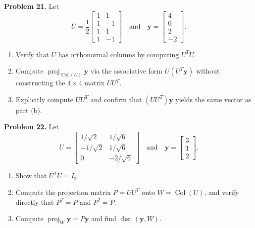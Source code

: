 \documentclass[11pt, letterpaper]{article}
\theoremstyle{definition}
\theoremstyle{remark}
\begin{document}
\textbf{Problem 21.} Let
\[
U = \frac{1}{2}\begin{bmatrix} 1 & 1 \\ 1 & -1 \\ 1 & 1 \\ 1 & -1 \end{bmatrix} \quad \text{and} \quad \mathbf{y} = \begin{bmatrix} 4 \\ 0 \\ 2 \\ -2 \end{bmatrix}.
\]
\begin{enumerate}[label=(\alph*)]
    \item Verify that $U$ has orthonormal columns by computing $U^T U$.
    \item Compute $\operatorname{proj}_{\operatorname{Col}(U)} \mathbf{y}$ via the associative form $U(U^T \mathbf{y})$ without constructing the $4 \times 4$ matrix $UU^T$.
    \item Explicitly compute $UU^T$ and confirm that $(UU^T)\mathbf{y}$ yields the same vector as part (b).
\end{enumerate}

\textbf{Problem 22.} Let
\[
U = \begin{bmatrix} 1/\sqrt{2} & 1/\sqrt{6} \\ -1/\sqrt{2} & 1/\sqrt{6} \\ 0 & -2/\sqrt{6} \end{bmatrix} \quad \text{and} \quad \mathbf{y} = \begin{bmatrix} 3 \\ 1 \\ 2 \end{bmatrix}.
\]
\begin{enumerate}[label=(\alph*)]
    \item Show that $U^T U = I_2$.
    \item Compute the projection matrix $P = UU^T$ onto $W = \operatorname{Col}(U)$, and verify directly that $P^T = P$ and $P^2 = P$.
    \item Compute $\operatorname{proj}_W \mathbf{y} = P\mathbf{y}$ and find $\operatorname{dist}(\mathbf{y}, W)$.
\end{enumerate}
\end{document}
